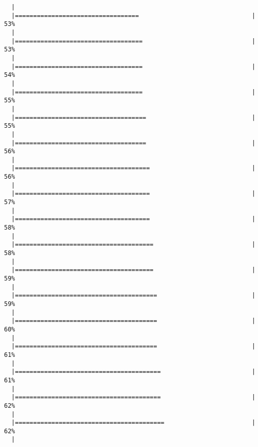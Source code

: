 \documentclass[]{article}
\begin{document}
\begin{verbatim}
  |                                                                       
  |==================================                               |  53%
  |                                                                       
  |===================================                              |  53%
  |                                                                       
  |===================================                              |  54%
  |                                                                       
  |===================================                              |  55%
  |                                                                       
  |====================================                             |  55%
  |                                                                       
  |====================================                             |  56%
  |                                                                       
  |=====================================                            |  56%
  |                                                                       
  |=====================================                            |  57%
  |                                                                       
  |=====================================                            |  58%
  |                                                                       
  |======================================                           |  58%
  |                                                                       
  |======================================                           |  59%
  |                                                                       
  |=======================================                          |  59%
  |                                                                       
  |=======================================                          |  60%
  |                                                                       
  |=======================================                          |  61%
  |                                                                       
  |========================================                         |  61%
  |                                                                       
  |========================================                         |  62%
  |                                                                       
  |=========================================                        |  62%
  |                                                                       

\end{verbatim}
\end{document}
